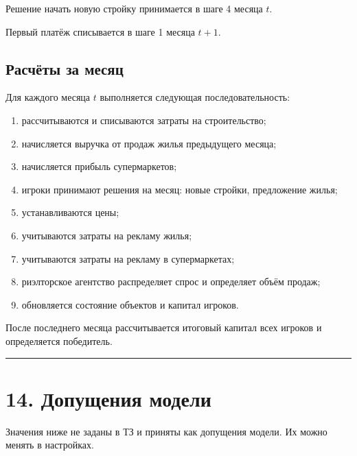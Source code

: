 \documentclass[
]{article}
\providecommand{\tightlist}{%
  \setlength{\itemsep}{0pt}\setlength{\parskip}{0pt}}
\begin{document}
Решение начать новую стройку принимается в шаге 4 месяца \(t\).

Первый платёж списывается в шаге 1 месяца \(t+1\).

\subsection{Расчёты за
месяц}\label{ux440ux430ux441ux447ux451ux442ux44b-ux437ux430-ux43cux435ux441ux44fux446}

Для каждого месяца \(t\) выполняется следующая последовательность:

\begin{enumerate}
\def\labelenumi{\arabic{enumi}.}
\tightlist
\item
  рассчитываются и списываются затраты на строительство;
\item
  начисляется выручка от продаж жилья предыдущего месяца;
\item
  начисляется прибыль супермаркетов;
\item
  игроки принимают решения на месяц: новые стройки, предложение жилья;
\item
  устанавливаются цены;
\item
  учитываются затраты на рекламу жилья;
\item
  учитываются затраты на рекламу в супермаркетах;
\item
  риэлторское агентство распределяет спрос и определяет объём продаж;
\item
  обновляется состояние объектов и капитал игроков.
\end{enumerate}

После последнего месяца рассчитывается итоговый капитал всех игроков и
определяется победитель.

\begin{center}\rule{0.5\linewidth}{0.5pt}\end{center}

\section{14. Допущения
модели}\label{ux434ux43eux43fux443ux449ux435ux43dux438ux44f-ux43cux43eux434ux435ux43bux438}

Значения ниже не заданы в ТЗ и приняты как допущения модели. Их можно
менять в настройках.
\end{document}
